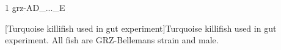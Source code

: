 
\begin{table}
\caption[Turquoise killifish used in \igseq pilot and ageing experiments]{Turquoise killifish used in \igseq pilot and ageing experiments. All fish are GRZ-AD strain and male.}
\label{tab:igseq-cohorts-fish}
\begin{threeparttable}

\begin{tablenotes}
\item[1] grz-AD\_...\_E
\end{tablenotes}
\end{threeparttable}
\end{table}

\begin{landscape}
\centering
\vspace*{\fill}
\scriptsize

\normalsize\vspace{1em}
[Turquoise killifish used in \igseq gut experiment]{Turquoise killifish used in \igseq gut experiment. All fish are GRZ-Bellemans strain and male.}
\label{tab:gut-cohorts-fish}
\vspace*{\fill}
\end{landscape}
